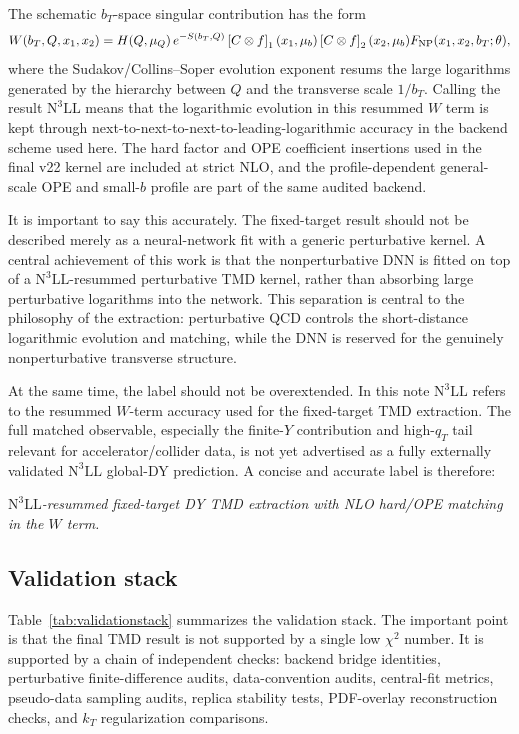 \documentclass[11pt]{article}
\newcommand{\bt}{b_T}
\newcommand{\kt}{k_T}
\newcommand{\qT}{q_T}
\newcommand{\FNP}{F_{\rm NP}}
\newcommand{\chisq}{\chi^2}
\newcommand{\NthreeLL}{\mathrm{N^{3}LL}}
\begin{document}
The schematic $\bt$-space singular contribution has the form
\begin{equation}
  W(\bt,Q,x_1,x_2)
  = H(Q,\mu_Q)\,
    e^{-S(\bt,Q)}
    \left[C\otimes f\right]_{1}(x_1,\mu_b)
    \left[C\otimes f\right]_{2}(x_2,\mu_b)
    \FNP(x_1,x_2,\bt;\theta),
\end{equation}
where the Sudakov/Collins--Soper evolution exponent resums the large logarithms generated by the hierarchy between $Q$ and the transverse scale $1/\bt$.  Calling the result $\NthreeLL$ means that the logarithmic evolution in this resummed $W$ term is kept through next-to-next-to-next-to-leading-logarithmic accuracy in the backend scheme used here.  The hard factor and OPE coefficient insertions used in the final v22 kernel are included at strict NLO, and the profile-dependent general-scale OPE and small-$b$ profile are part of the same audited backend.

It is important to say this accurately.  The fixed-target result should not be described merely as a neural-network fit with a generic perturbative kernel.  A central achievement of this work is that the nonperturbative DNN is fitted on top of a $\NthreeLL$-resummed perturbative TMD kernel, rather than absorbing large perturbative logarithms into the network.  This separation is central to the philosophy of the extraction: perturbative QCD controls the short-distance logarithmic evolution and matching, while the DNN is reserved for the genuinely nonperturbative transverse structure.

At the same time, the label should not be overextended.  In this note $\NthreeLL$ refers to the resummed $W$-term accuracy used for the fixed-target TMD extraction.  The full matched observable, especially the finite-$Y$ contribution and high-$\qT$ tail relevant for accelerator/collider data, is not yet advertised as a fully externally validated $\NthreeLL$ global-DY prediction.  A concise and accurate label is therefore:
\begin{center}
\emph{$\NthreeLL$-resummed fixed-target DY TMD extraction with NLO hard/OPE matching in the $W$ term.}
\end{center}

\subsection{Validation stack}

Table~\ref{tab:validationstack} summarizes the validation stack.  The important point is that the final TMD result is not supported by a single low $\chisq$ number.  It is supported by a chain of independent checks: backend bridge identities, perturbative finite-difference audits, data-convention audits, central-fit metrics, pseudo-data sampling audits, replica stability tests, PDF-overlay reconstruction checks, and $\kt$ regularization comparisons.
\end{document}
